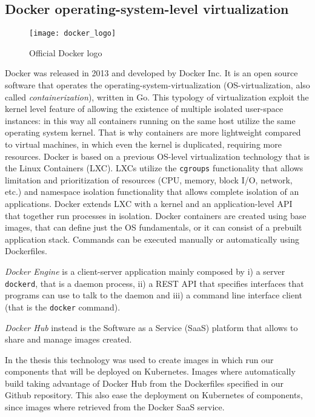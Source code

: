 \subsection{Docker operating-system-level virtualization}
\begin{figure}[H]
  \centering \texttt{[image: docker\_logo]}
  \caption{Official Docker logo}
  \label{chap:intro:img:docker_logo}
\end{figure}
Docker was released in 2013 and developed by Docker Inc. It is an open source
software that operates the operating-system-virtualization (OS-virtualization,
also called \emph{containerization}), written in Go. This typology of
virtualization exploit the kernel level feature of allowing the existence of
multiple isolated user-space instances: in this way all containers running on
the same host utilize the same operating system kernel. That is why containers
are more lightweight compared to virtual machines, in which even the kernel is
duplicated, requiring more resources. Docker is based on a previous OS-level
virtualization technology that is the Linux Containers (LXC). LXCs utilize the 
\texttt{cgroups} functionality that allows limitation and prioritization of
resources (CPU, memory, block I/O, network, etc.) and namespace isolation
functionality that allows complete isolation of an applications. Docker extends
LXC with a kernel and an application-level API that together run processes in
isolation. Docker containers are created using base images, that can define just
the OS fundamentals, or it can consist of a prebuilt application stack.
Commands can be executed manually or automatically using Dockerfiles.

\emph{Docker Engine} is a client-server application mainly composed by i) a
server \texttt{dockerd}, that is a daemon process, ii) a REST API that specifies
interfaces that programs can use to talk to the daemon and iii) a command line
interface client (that is the \texttt{docker} command).

\emph{Docker Hub} instead is the Software as a Service (SaaS) platform that
allows to share and manage images created.

In the thesis this technology was used to create images in which run our
components that will be deployed on Kubernetes. Images where automatically build
taking advantage of Docker Hub from the Dockerfiles specified in our Github
repository. This also ease the deployment on Kubernetes of components, since
images where retrieved from the Docker SaaS service.

